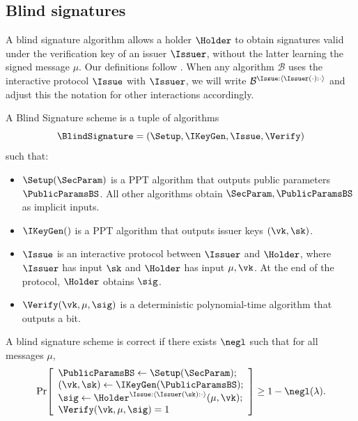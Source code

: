 


\subsection{Blind signatures}
A blind signature algorithm allows a holder $\Holder$ to obtain signatures valid under the verification key of an issuer $\Issuer$, without the latter learning the signed message $\mu$. Our definitions follow \cite{C:Fischlin06}. When any algorithm $\mathcal{B}$ uses the interactive protocol $\Issue$ with $\Issuer$, we will write $\mathcal{B}^{\Issue:\langle \Issuer(\cdot):\cdot \rangle}$ and adjust this the notation for other interactions accordingly.

\begin{definition}\label{def:bs-syntax}
	A Blind Signature scheme is a tuple of algorithms
	\[
	\BlindSignature=(\Setup,\IKeyGen,\Issue,\Verify)
	\]
	such that:
	\begin{itemize}[leftmargin=1.25em]
		\item $\Setup(\SecParam)$ is a PPT algorithm that outputs public parameters $\PublicParamsBS$. All other algorithms obtain $\SecParam,\PublicParamsBS$ as implicit inputs.
		\item $\IKeyGen()$ is a PPT algorithm that outputs issuer keys $(\vk,\sk)$.
		\item $\Issue$ is an interactive protocol between $\Issuer$ and $\Holder$, where $\Issuer$ has input $\sk$ and $\Holder$ has input $\mu,\vk$. At the end of the protocol, $\Holder$ obtains $\sig$.
		\item $\Verify(\vk,\mu,\sig)$ is a deterministic polynomial-time algorithm that outputs a bit.
	\end{itemize}
\end{definition}

\begin{definition}[Correctness]\label{def:bs-correctness}
	A blind signature scheme is correct if there exists \(\negl\) such that for all messages \(\mu\),
	\[
	\Pr\!\left[
	\begin{array}{l}
		\PublicParamsBS \gets \Setup(\SecParam); \\
		(\vk,\sk)\gets \IKeyGen(\PublicParamsBS);\\
		\sig\gets \Holder^{\Issue: \langle \Issuer(\sk): \cdot  \rangle }(\mu,\vk);\\
		\Verify(\vk,\mu,\sig)=1
	\end{array}
	\right]
	\ge 1-\negl(\lambda).
	\]
\end{definition}


